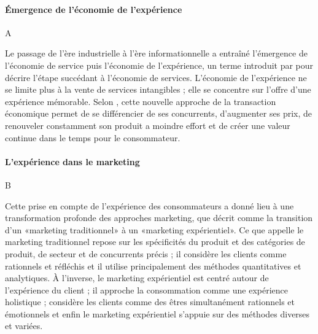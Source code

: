 \documentclass[a4paper,12pt, openany]{book}
\begin{document}


\paragraph{Émergence de l'économie de l'expérience} A

Le passage de l'ère industrielle à l'ère informationnelle a entraîné l'émergence de l'économie de service puis l'économie de l'expérience, un terme introduit par \textcite{pine99} pour décrire l'étape succédant à l'économie de services. L'économie de l'expérience ne se limite plus à la vente de services intangibles ; elle se concentre sur l'offre d'une expérience mémorable. Selon \textcite{pine99}, cette nouvelle approche de la transaction économique permet de se différencier de ses concurrents, d'augmenter ses prix, de renouveler constamment son produit a moindre effort et de créer une valeur continue dans le temps pour le consommateur. \par 


\paragraph{L'expérience dans le marketing} B

Cette prise en compte de l'expérience des consommateurs a donné lieu à une transformation profonde des approches marketing, que \textcite{schmitt99} décrit comme la transition d'un «\;marketing traditionnel\;» à un «\;marketing expérientiel\;». Ce que \textcite{schmitt99} appelle le marketing traditionnel repose sur les spécificités du produit et des catégories de produit, de secteur et de concurrents précis ; il considère les clients comme rationnels et réfléchis et il utilise principalement des méthodes quantitatives et analytiques. À l'inverse, le marketing expérientiel est centré autour de l'expérience du client ; il approche la consommation comme une expérience holistique ; considère les clients comme des êtres simultanément rationnels et émotionnels et enfin le marketing expérientiel s'appuie sur des méthodes diverses et variées. \par 
\end{document}
